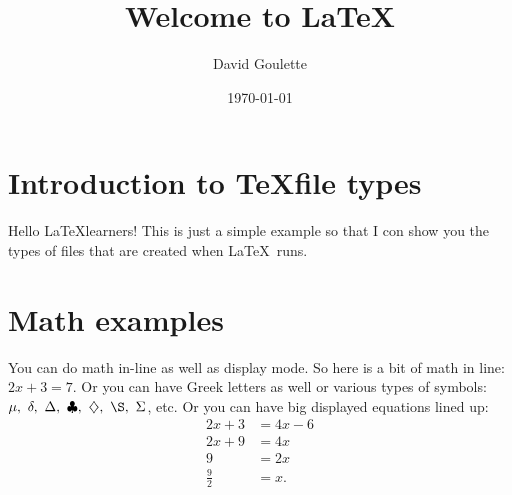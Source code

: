 \documentclass[11pt]{article}
\title{Welcome to \LaTeX}
\author{David Goulette}
\date{\today}
\newcommand{\latex}{\LaTeX}
\begin{document}
\maketitle
\section{Introduction to \TeX file types}
Hello \latex learners!  This is just a simple example so that I con show you the types of files that are created when \LaTeX\ runs.
\section{Math examples}
You can do math in-line as well as display mode.  So here is a bit of math in line: $2x+3=7$. Or you can have Greek letters as well or various types of symbols: $\mu,\ \delta,\ \Delta,\ \clubsuit,\ \diamondsuit,\ \S,\ \Sigma$, etc.  Or you can have big displayed equations lined up:
\begin{align*}
2x+3 &=  4x-6\\
2x+9 &=  4x\\
9 &=  2x\\
\frac{9}{2} &= x.
\end{align*}
\end{document}
